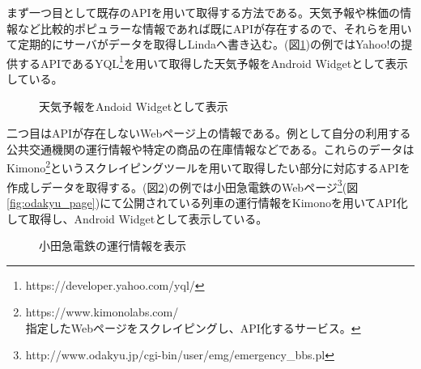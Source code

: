 まず一つ目として既存のAPIを用いて取得する方法である。天気予報や株価の情報など比較的ポピュラーな情報であれば既にAPIが存在するので、それらを用いて定期的にサーバがデータを取得しLindaへ書き込む。(図\ref{fig:weather_widget})の例ではYahoo!の提供するAPIであるYQL\footnote{https://developer.yahoo.com/yql/}を用いて取得した天気予報をAndroid Widgetとして表示している。

\begin{figure}[htbp]
  \begin{minipage}{\hsize}
    \begin{center}
    \end{center}
    \caption{天気予報をAndoid Widgetとして表示}
    \label{fig:weather_widget}
  \end{minipage}
\end{figure}

二つ目はAPIが存在しないWebページ上の情報である。例として自分の利用する公共交通機関の運行情報や特定の商品の在庫情報などである。これらのデータはKimono\footnote{https://www.kimonolabs.com/\\指定したWebページをスクレイピングし、API化するサービス。}というスクレイピングツールを用いて取得したい部分に対応するAPIを作成しデータを取得する。(図\ref{fig:odakyu_widget})の例では小田急電鉄のWebページ\footnote{http://www.odakyu.jp/cgi-bin/user/emg/emergency\_bbs.pl}(図\ref{fig:odakyu_page})にて公開されている列車の運行情報をKimonoを用いてAPI化して取得し、Android Widgetとして表示している。

\begin{figure}[htbp]
  \begin{minipage}{\hsize}
    \begin{center}
    \end{center}
    \caption{小田急電鉄の運行情報を表示}
    \label{fig:odakyu_widget}
  \end{minipage}
\end{figure}

